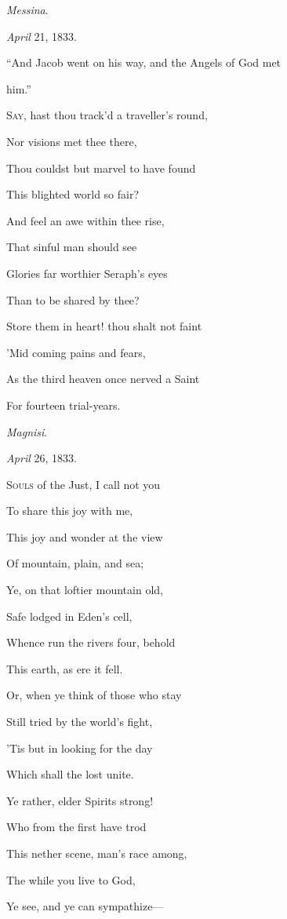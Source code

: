 \emph{Messina}.

\emph{April} 21, 1833.


``And Jacob went on his way, and the Angels
of God met

him.''

S\textsc{ay}, hast thou track'd a traveller's round,

Nor visions met thee there,

Thou couldst but marvel to have found

This blighted world so fair?

And feel an awe within thee rise,

That sinful man should see

Glories far worthier Seraph's eyes

Than to be shared by thee?

Store them in heart! thou shalt not faint

'Mid coming pains and fears,

As the third heaven once nerved a Saint

For fourteen trial-years.

\emph{Magnisi}.

\emph{April} 26, 1833.


S\textsc{ouls} of the Just, I call not you

To share this joy with me,

This joy and wonder at the view

Of mountain, plain, and sea;

Ye, on that loftier mountain old,

Safe lodged in Eden's cell,

Whence run the rivers four, behold

This earth, as ere it fell.

Or, when ye think of those who stay

Still tried by the world's fight,

'Tis but in looking for the day

Which shall the lost unite. 

Ye rather, elder Spirits strong!

Who from the first have trod

This nether scene, man's race among,

The while you live to God,

Ye see, and ye can sympathize—

